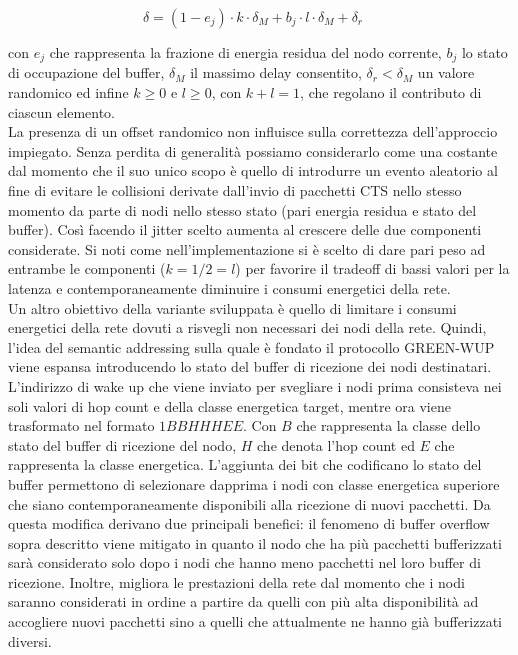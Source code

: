 \documentclass[binding=0.6cm,TFA]{sapthesis}
\begin{document}
\begin{equation}
    \delta= (1-e_{j}) \cdot k \cdot \delta_{M} + b_{j} \cdot l \cdot \delta_{M} + \delta_{r} \quad
\end{equation}

con $e_{j}$ che rappresenta la frazione di energia residua del nodo corrente, $b_{j}$ lo stato di occupazione del buffer, $\delta_{M}$ il massimo
delay consentito, $\delta_{r} < \delta_{M}$ un valore randomico ed infine $k \geq 0$ e $l \geq 0$, con $k+l=1$, che regolano il contributo di
ciascun elemento.\\

La presenza di un offset randomico non influisce sulla correttezza dell'approccio impiegato. Senza perdita di generalità possiamo considerarlo come una
costante dal momento che il suo unico scopo è quello di introdurre un evento aleatorio al fine di evitare le collisioni derivate dall'invio di pacchetti CTS
nello stesso momento da parte di nodi nello stesso stato (pari energia residua e stato del buffer). Così facendo il jitter scelto aumenta al crescere
delle due componenti considerate. Si noti come nell'implementazione si è scelto di dare pari peso ad entrambe le componenti ($k=1/2=l$) per favorire il
tradeoff di bassi valori per la latenza e contemporaneamente diminuire i consumi energetici della rete.\\

Un altro obiettivo della variante sviluppata è quello di limitare i consumi energetici della rete dovuti a risvegli non necessari dei nodi della rete. Quindi,
l'idea del semantic addressing sulla quale è fondato il protocollo GREEN-WUP viene espansa introducendo lo stato del buffer di ricezione dei nodi destinatari.
L'indirizzo di wake up che viene inviato per svegliare i nodi prima consisteva nei soli valori di hop count e della classe energetica target, mentre ora viene
trasformato nel formato $1BBHHHEE$. Con $B$ che rappresenta la classe dello stato del buffer di ricezione del nodo, $H$ che denota l'hop count ed $E$ che
rappresenta la classe energetica. L'aggiunta dei bit che codificano lo stato del buffer permettono di selezionare dapprima i nodi con classe energetica
superiore che siano contemporaneamente disponibili alla ricezione di nuovi pacchetti. Da questa modifica derivano due principali benefici: il fenomeno
di buffer overflow sopra descritto viene mitigato in quanto il nodo che ha più pacchetti bufferizzati sarà considerato solo dopo i nodi che hanno meno
pacchetti nel loro buffer di ricezione. Inoltre, migliora le prestazioni della rete dal momento che i nodi saranno considerati in ordine a partire da quelli
con più alta disponibilità ad accogliere nuovi pacchetti sino a quelli che attualmente ne hanno già bufferizzati diversi.\\
\end{document}
